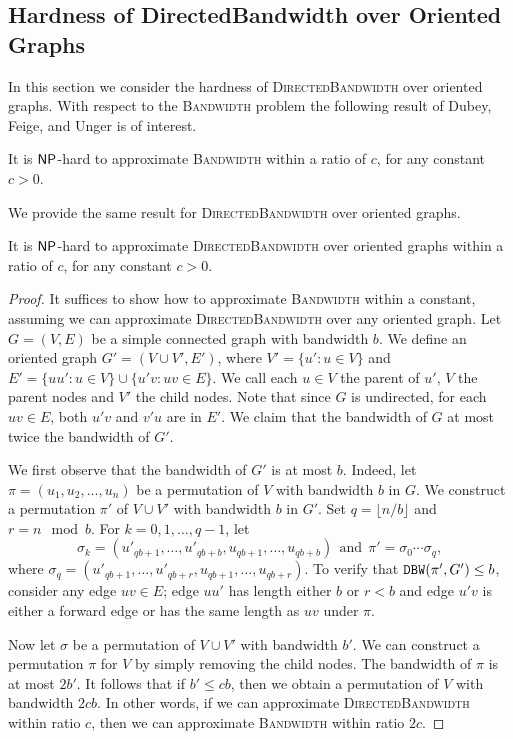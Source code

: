 \subsection{Hardness of DirectedBandwidth over Oriented Graphs}
\label{subsec:hardness-of-directedbandwidth}

In this section we consider the hardness of \textsc{DirectedBandwidth} over oriented graphs.
%
With respect to the \textsc{Bandwidth} problem the following result of Dubey, Feige, and Unger is of interest.

\begin{theorem}
    It is $\mathsf{NP}$-hard to approximate \textsc{Bandwidth} within a ratio of $c$, for any constant $c > 0$.
\end{theorem}

We provide the same result for \textsc{DirectedBandwidth} over oriented graphs.

\begin{theorem}
    It is $\mathsf{NP}$-hard to approximate \textsc{DirectedBandwidth} over oriented graphs within a ratio of $c$, for any constant $c > 0$.
\end{theorem}

\begin{proof}
    It suffices to show how to approximate \textsc{Bandwidth} within a constant, assuming we can approximate \textsc{DirectedBandwidth} over any oriented graph.
    Let $G = (V, E)$ be a simple connected graph with bandwidth $b$.
    We define an oriented graph $G' = (V \cup V', E')$, where $V' = \{u' : u \in V \}$ and $E'=\{uu' : u \in V \} \cup \{ u'v : uv \in E \}$.
    We call each $u \in V$ the parent of $u'$, $V$ the parent nodes and $V'$ the
    child nodes.
    Note that since $G$ is undirected, for each $uv \in E$, both $u'v$ and $v'u$
    are in $E'$.
    We claim that the bandwidth of $G$ at most twice the bandwidth of $G'$.

    We first observe that the bandwidth of $G'$ is at most $b$.
    Indeed, let $\pi = (u_1, u_2, \dots, u_n)$ be a permutation of $V$ with
    bandwidth $b$ in $G$.
    We construct a permutation $\pi'$ of $V\cup V'$ with bandwidth $b$ in $G'$.
    Set $q = \lfloor n / b \rfloor$ and $r = n \mod b$.
    For $k = 0, 1, \dots, q - 1$, let
    \[ \sigma_k = (u'_{qb + 1}, \dots, u'_{qb + b}, u_{qb + 1}, \dots, u_{qb + b}) ~~\text{and}~~ \pi' = \sigma_0 \cdots \sigma_q, \]
    where $\sigma_q = (u'_{qb + 1}, \dots, u'_{qb + r}, u_{qb + 1}, \dots, u_{qb + r})$.
    To verify that $\mathtt{DBW}(\pi', G') \le b$, consider any edge $uv \in E$; edge $uu'$ has length either $b$ or $r < b$ and edge $u'v$ is either a forward
    edge or has the same length as $uv$ under $\pi$.

    Now let $\sigma$ be a permutation of $V\cup V'$ with bandwidth $b'$.
    We can construct a permutation $\pi$ for $V$ by simply removing the child nodes.
    The bandwidth of $\pi$ is at most $2b'$.
    It follows that if $b'\le c b$, then we obtain a permutation of $V$ with bandwidth $2c b$.
    In other words, if we can approximate \textsc{DirectedBandwidth} within ratio $c$, then we can approximate \textsc{Bandwidth} within ratio $2c$.
\end{proof}